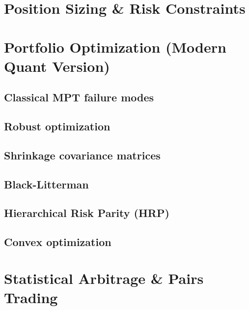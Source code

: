 \documentclass{report}
\begin{document}
\section{Position Sizing \& Risk Constraints}

\section{Portfolio Optimization (Modern Quant Version)}
\subsection*{Classical MPT failure modes}
\subsection*{Robust optimization}
\subsection*{Shrinkage covariance matrices}
\subsection*{Black-Litterman}
\subsection*{Hierarchical Risk Parity (HRP)}
\subsection*{Convex optimization}

\section{Statistical Arbitrage \& Pairs Trading}
\end{document}
